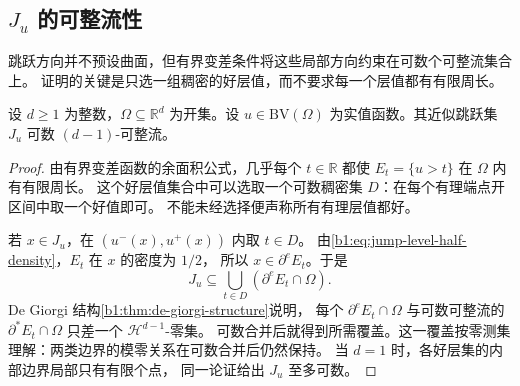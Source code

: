 \subsection{\texorpdfstring{\(J_u\)}{Ju} 的可整流性}
\label{b1:subsec:280204}

跳跃方向并不预设曲面，但有界变差条件将这些局部方向约束在可数个可整流集合上。
证明的关键是只选一组稠密的好层值，而不要求每一个层值都有有限周长。

\begin{proposition}\label{b1:prop:bv-jump-rectifiable}
设 \(d\ge1\) 为整数，\(\Omega\subseteq\mathbb R^d\) 为开集。设 \(u\in\mathrm{BV}(\Omega)\) 为实值函数。其近似跳跃集 \(J_u\) 可数 \((d-1)\)-可整流。
\end{proposition}
\begin{proof}
由有界变差函数的余面积公式，几乎每个 \(t\in\mathbb R\) 都使
\(E_t=\{u>t\}\) 在 \(\Omega\) 内有有限周长。
这个好层值集合中可以选取一个可数稠密集 \(D\)：在每个有理端点开区间中取一个好值即可。
不能未经选择便声称所有有理层值都好。

若 \(x\in J_u\)，在 \((u^-(x),u^+(x))\) 内取 \(t\in D\)。
由\eqref{b1:eq:jump-level-half-density}，\(E_t\) 在 \(x\) 的密度为 \(1/2\)，
所以 \(x\in\partial^eE_t\)。于是
\[
 J_u\subseteq\bigcup_{t\in D}(\partial^eE_t\cap\Omega).
\]
De Giorgi 结构\cref{b1:thm:de-giorgi-structure}说明，
每个 \(\partial^eE_t\cap\Omega\) 与可数可整流的
\(\partial^*E_t\cap\Omega\) 只差一个 \(\mathcal H^{d-1}\)-零集。
可数合并后就得到所需覆盖。这一覆盖按零测集理解：两类边界的模零关系在可数合并后仍然保持。
当 \(d=1\) 时，各好层集的内部边界局部只有有限个点，
同一论证给出 \(J_u\) 至多可数。
\end{proof}

